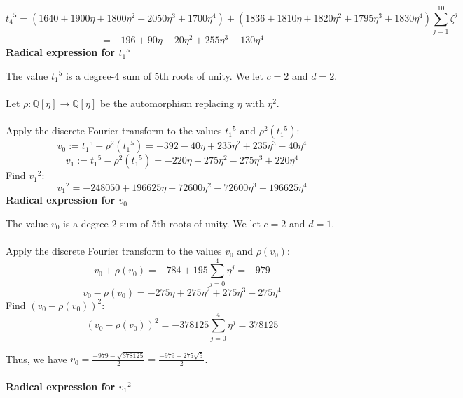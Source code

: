 \documentclass{article}
\begin{document}
\begin{adjustwidth}{1cm}{}
            $$ {t_4}^5 = (1640 + 1900\eta + 1800\eta^2 + 2050\eta^3 + 1700\eta^4) + (1836 + 1810\eta + 1820\eta^2 + 1795\eta^3 + 1830\eta^4) \sum_{j = 1}^{10} \zeta^j $$
            $$ = -196 + 90 \eta - 20 \eta^2 + 255 \eta^3 - 130 \eta^4 $$
            \textbf{Radical expression for $ {t_1}^5 $}\\
            \begin{adjustwidth}{1cm}{}
                The value $ {t_1}^5 $ is a degree-$ 4 $ sum of $ 5 $th roots of unity. We let $ c = 2 $ and $ d = 2 $.\\
                \\
                Let $ \rho: \mathbb{Q}[\eta] \rightarrow \mathbb{Q}[\eta] $ be the automorphism replacing $ \eta $ with $ \eta^2 $.\\
                \\
                Apply the discrete Fourier transform to the values $ {t_1}^5 $ and $ \rho^2({t_1}^5) $:
                $$ v_0 := {t_1}^5 + \rho^2({t_1}^5) = -392 - 40 \eta + 235 \eta^2 + 235 \eta^3 - 40 \eta^4 $$
                $$ v_1 := {t_1}^5 - \rho^2({t_1}^5) = -220 \eta + 275 \eta^2 - 275 \eta^3 + 220 \eta^4 $$
                Find $ {v_1}^2 $:
                $$ {v_1}^2 = -248050 + 196625 \eta - 72600 \eta^2 - 72600 \eta^3 + 196625 \eta^4 $$
                \textbf{Radical expression for $ v_0 $}\\
                \begin{adjustwidth}{1cm}{}
                    The value $ v_0 $ is a degree-$ 2 $ sum of $ 5 $th roots of unity. We let $ c = 2 $ and $ d = 1 $.\\
                    \\
                    Apply the discrete Fourier transform to the values $ v_0 $ and $ \rho(v_0) $:
                    $$ v_0 + \rho(v_0) = -784 + 195\sum_{j = 0}^4 \eta^j = -979 $$
                    $$ v_0 - \rho(v_0) = -275 \eta + 275 \eta^2 + 275 \eta^3 - 275 \eta^4 $$
                    Find $ (v_0 - \rho(v_0))^2 $:
                    $$ (v_0 - \rho(v_0))^2 = -378125\sum_{j = 0}^4 \eta^j = 378125 $$
                \end{adjustwidth}
                Thus, we have $ v_0 = \frac{-979 - \sqrt{378125}}{2} = \frac{-979-275 \sqrt{5}}{2} $.\\
                \\
                \textbf{Radical expression for $ {v_1}^2 $}\\
                \begin{adjustwidth}{1cm}{}

\end{adjustwidth}
\end{adjustwidth}
\end{adjustwidth}
\end{document}
